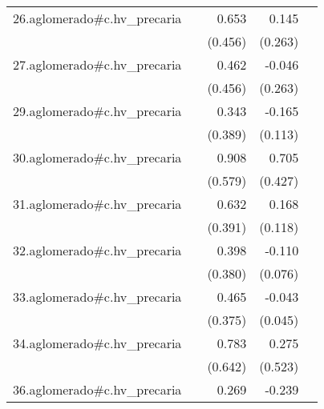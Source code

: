 {\begin{longtable}{l*{4}{D{.}{.}{-1}}}
\addlinespace
26.aglomerado#c.hv\_precaria&                     &       0.653         &       0.145         &                     \\
            &                     &     (0.456)         &     (0.263)         &                     \\
\addlinespace
27.aglomerado#c.hv\_precaria&                     &       0.462         &      -0.046         &                     \\
            &                     &     (0.456)         &     (0.263)         &                     \\
\addlinespace
29.aglomerado#c.hv\_precaria&                     &       0.343         &      -0.165         &                     \\
            &                     &     (0.389)         &     (0.113)         &                     \\
\addlinespace
30.aglomerado#c.hv\_precaria&                     &       0.908         &       0.705         &                     \\
            &                     &     (0.579)         &     (0.427)         &                     \\
\addlinespace
31.aglomerado#c.hv\_precaria&                     &       0.632         &       0.168         &                     \\
            &                     &     (0.391)         &     (0.118)         &                     \\
\addlinespace
32.aglomerado#c.hv\_precaria&                     &       0.398         &      -0.110         &                     \\
            &                     &     (0.380)         &     (0.076)         &                     \\
\addlinespace
33.aglomerado#c.hv\_precaria&                     &       0.465         &      -0.043         &                     \\
            &                     &     (0.375)         &     (0.045)         &                     \\
\addlinespace
34.aglomerado#c.hv\_precaria&                     &       0.783         &       0.275         &                     \\
            &                     &     (0.642)         &     (0.523)         &                     \\
\addlinespace
36.aglomerado#c.hv\_precaria&                     &       0.269         &      -0.239         &                     \\

\end{longtable}}
